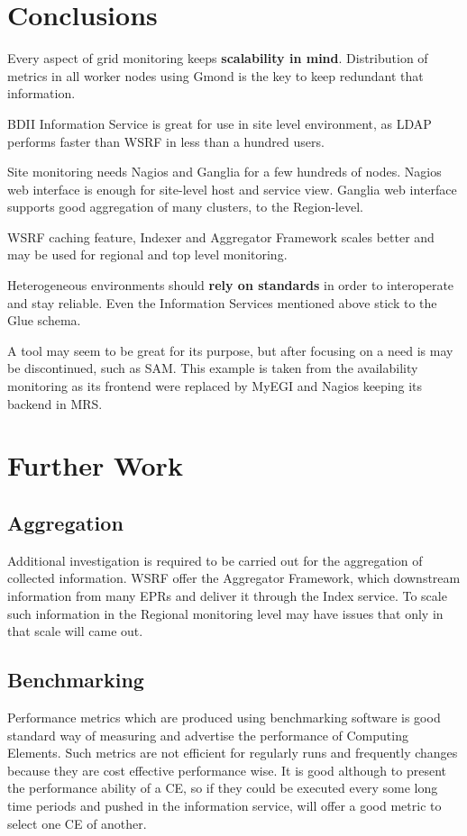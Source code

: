 \section{Conclusions}

Every aspect of grid monitoring keeps {\bf scalability in mind}. Distribution of metrics in all worker nodes using Gmond is the key to keep redundant that information.

BDII Information Service is great for use in site level environment, as LDAP performs faster than WSRF in less than a hundred users.

Site monitoring needs Nagios and Ganglia for a few hundreds of nodes. Nagios web interface is enough for site-level host and service view. Ganglia web interface supports good aggregation of many clusters, to the Region-level.

WSRF caching feature, Indexer and Aggregator Framework scales better and may be used for regional and top level monitoring.

Heterogeneous environments should {\bf rely on standards} in order to interoperate and stay reliable. Even the Information Services mentioned above stick to the Glue schema.

A tool may seem to be great for its purpose, but after focusing on a need is may be discontinued, such as SAM. This example is taken from the availability monitoring as its frontend were replaced by MyEGI and Nagios keeping its backend in MRS.

\section{Further Work}

\subsection{Aggregation}

Additional investigation is required to be carried out for the aggregation of collected information. WSRF offer the Aggregator Framework, which downstream information from many EPRs and deliver it through the Index service. To scale such information in the Regional monitoring level may have issues that only in that scale will came out.

\subsection{Benchmarking}

Performance metrics which are produced using benchmarking software is good standard way of measuring and advertise the performance of Computing Elements. Such metrics are not efficient for regularly runs and frequently changes because they are cost effective performance wise. It is good although to present the performance ability of a CE, so if they could be executed every some long time periods and pushed in the information service, will offer a good metric to select one CE of another.

